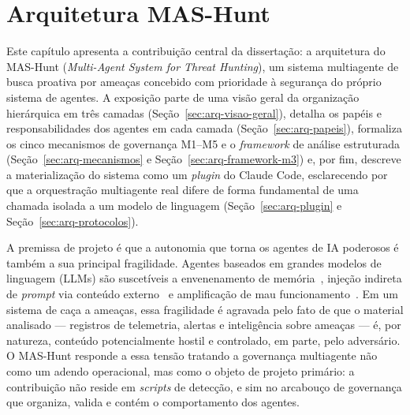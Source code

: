 \chapter{Arquitetura MAS-Hunt}
\label{cap:arquitetura}

Este capítulo apresenta a contribuição central da dissertação: a arquitetura do
MAS-Hunt (\emph{Multi-Agent System for Threat Hunting}), um sistema multiagente
de busca proativa por ameaças concebido com prioridade à segurança do próprio
sistema de agentes. A exposição parte de uma visão geral da organização
hierárquica em três camadas (Seção~\ref{sec:arq-visao-geral}), detalha os papéis
e responsabilidades dos agentes em cada camada (Seção~\ref{sec:arq-papeis}),
formaliza os cinco mecanismos de governança M1--M5 e o \emph{framework} de
análise estruturada (Seção~\ref{sec:arq-mecanismos} e
Seção~\ref{sec:arq-framework-m3}) e, por fim, descreve a materialização do sistema
como um \emph{plugin} do Claude Code, esclarecendo por que a orquestração
multiagente real difere de forma fundamental de uma chamada isolada a um modelo de
linguagem (Seção~\ref{sec:arq-plugin} e Seção~\ref{sec:arq-protocolos}).

A premissa de projeto é que a autonomia que torna os agentes de IA poderosos é
também a sua principal fragilidade. Agentes baseados em grandes modelos de
linguagem (LLMs) são suscetíveis a envenenamento de
memória~\cite{NEURIPS2024_eb113910}, injeção indireta de
\emph{prompt} via conteúdo externo~\cite{zhan2024injecagent} e amplificação de
mau funcionamento~\cite{zhang2024breaking}. Em um
sistema de caça a ameaças, essa fragilidade é agravada pelo fato de que o
material analisado — registros de telemetria, alertas e inteligência sobre
ameaças — é, por natureza, conteúdo potencialmente hostil e controlado, em parte,
pelo adversário. O MAS-Hunt responde a essa tensão tratando a governança
multiagente não como um adendo operacional, mas como o objeto de projeto
primário: a contribuição não reside em \emph{scripts} de detecção, e sim no
arcabouço de governança que organiza, valida e contém o comportamento dos
agentes.

